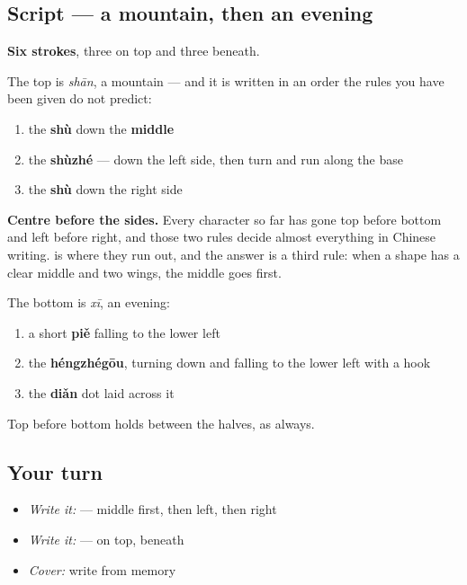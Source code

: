 \subsection*{Script — a mountain, then an evening}

\begin{quote}
\end{quote}

\textbf{Six strokes}, three on top and three beneath.

The top is  \emph{shān}, a mountain — and it is written in an order the rules you have been given do not predict:

\begin{enumerate}
\raggedright
  \item the \textbf{shù} down the \textbf{middle}
  \item the \textbf{shùzhé} — down the left side, then turn and run along the base
  \item the \textbf{shù} down the right side
\end{enumerate}

\textbf{Centre before the sides.} Every character so far has gone top before bottom and left before right, and those two rules decide almost everything in Chinese writing.  is where they run out, and the answer is a third rule: when a shape has a clear middle and two wings, the middle goes first.

The bottom is  \emph{xī}, an evening:

\begin{enumerate}
\raggedright
  \item a short \textbf{piě} falling to the lower left
  \item the \textbf{héngzhégōu}, turning down and falling to the lower left with a hook
  \item the \textbf{diǎn} dot laid across it
\end{enumerate}

Top before bottom holds between the halves, as always.

\subsection*{Your turn}
\begin{itemize}
\raggedright
  \item \emph{Write it:}  — middle first, then left, then right
  \item \emph{Write it:}  —  on top,  beneath
  \item \emph{Cover:} write  from memory
\end{itemize}

